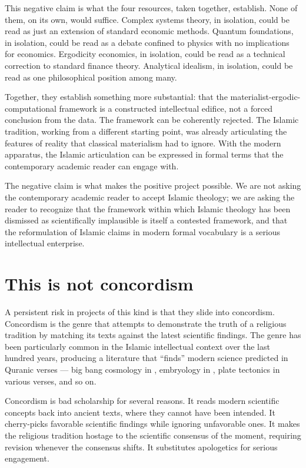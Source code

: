This negative claim is what the four resources, taken together,
establish. None of them, on its own, would suffice. Complex systems
theory, in isolation, could be read as just an extension of standard
economic methods. Quantum foundations, in isolation, could be read
as a debate confined to physics with no implications for economics.
Ergodicity economics, in isolation, could be read as a technical
correction to standard finance theory. Analytical idealism, in
isolation, could be read as one philosophical position among many.

Together, they establish something more substantial: that the
materialist-ergodic-computational framework is a constructed
intellectual edifice, not a forced conclusion from the data. The
framework can be coherently rejected. The Islamic tradition, working
from a different starting point, was already articulating the
features of reality that classical materialism had to ignore. With
the modern apparatus, the Islamic articulation can be expressed in
formal terms that the contemporary academic reader can engage with.

The negative claim is what makes the positive project possible. We
are not asking the contemporary academic reader to accept Islamic
theology; we are asking the reader to recognize that the framework
within which Islamic theology has been dismissed as scientifically
implausible is itself a contested framework, and that the
reformulation of Islamic claims in modern formal vocabulary is a
serious intellectual enterprise.

\section{This is not concordism}
\label{sec:not-concordism}

A persistent risk in projects of this kind is that they slide into
concordism. Concordism is the genre that attempts to demonstrate the
truth of a religious tradition by matching its texts against the
latest scientific findings. The genre has been particularly common
in the Islamic intellectual context over the last hundred years,
producing a literature that ``finds'' modern science predicted in
Quranic verses --- big bang cosmology in , embryology
in , plate tectonics in various verses, and so on.

Concordism is bad scholarship for several reasons. It reads modern
scientific concepts back into ancient texts, where they cannot have
been intended. It cherry-picks favorable scientific findings while
ignoring unfavorable ones. It makes the religious tradition hostage
to the scientific consensus of the moment, requiring revision
whenever the consensus shifts. It substitutes apologetics for
serious engagement.

